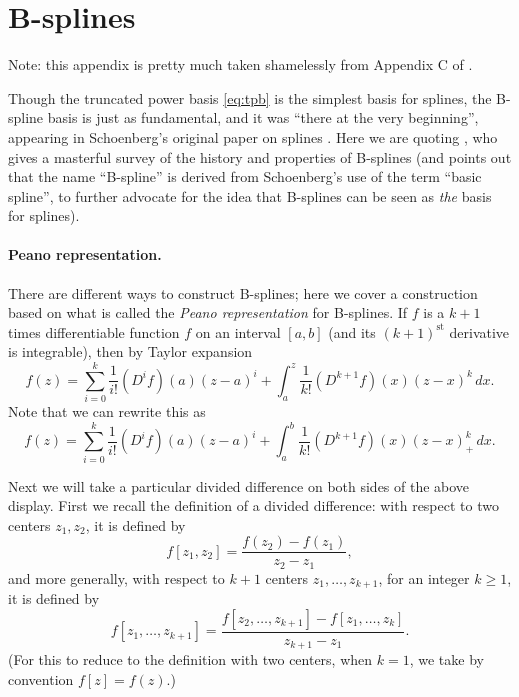 \documentclass{article}
\begin{document}



\clearpage
\appendix

\section{B-splines}
\label{app:bs}

Note: this appendix is pretty much taken shamelessly from Appendix C of 
\citet{tibshirani2022divided}.

Though the truncated power basis \eqref{eq:tpb} is the simplest basis for
splines, the B-spline basis is just as fundamental, and it was ``there at the 
very beginning'', appearing in Schoenberg's original paper on splines
\citep{schoenberg1946contributions1}. Here we are quoting
\citet{deboor1976splines}, who gives a masterful survey of the history and
properties of B-splines (and points out that the name ``B-spline'' is derived
from Schoenberg's use of the term ``basic spline'', to further advocate for the
idea that B-splines can be seen as \emph{the} basis for splines).

\paragraph{Peano representation.}

\def\st{^{\text{st}}}

There are different ways to construct B-splines; here we cover a construction
based on what is called the \emph{Peano representation} for B-splines. If $f$ is
a $k+1$ times differentiable function $f$ on an interval $[a,b]$ (and its
$(k+1)\st$ derivative is integrable), then by Taylor expansion
\[
f(z) = \sum_{i=0}^k \frac{1}{i!} (D^i f)(a) (z-a)^i + 
\int_a^z \frac{1}{k!} (D^{k+1} f)(x) (z-x)^k \, dx.
\]
Note that we can rewrite this as
\begin{equation}
\label{eq:taylor}
f(z) = \sum_{i=0}^k \frac{1}{i!} (D^i f)(a) (z-a)^i + 
\int_a^b \frac{1}{k!} (D^{k+1} f)(x) (z-x)^k_+ \, dx. 
\end{equation}

Next we will take a particular divided difference on both sides of the above
display. First we recall the definition of a divided difference: with respect to
two centers $z_1,z_2$, it is defined by       
\[
f[z_1,z_2] =  \frac{f(z_2)-f(z_1)}{z_2-z_1},
\]
and more generally, with respect to $k+1$ centers $z_1,\dots,z_{k+1}$, for an
integer $k \geq 1$, it is defined by  
\[
f[z_1,\dots,z_{k+1}] = \frac{f[z_2,\dots,z_{k+1}] -
f[z_1,\dots,z_k]}{z_{k+1}-z_1}.
\]
(For this to reduce to the definition with two centers, when $k=1$, we take by 
convention $f[z]=f(z)$.)   
\end{document}
